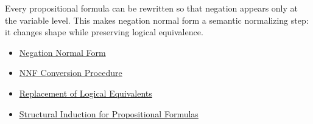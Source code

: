 \begin{remark*}[Interpretation]
Every propositional formula can be rewritten so that negation appears only at
the variable level. This makes negation normal form a semantic normalizing step:
it changes shape while preserving logical equivalence.
\end{remark*}

\begin{dependencies}
\begin{itemize}
  \item \hyperref[def:negation-normal-form-propositional-logic]{Negation Normal Form}
  \item \hyperref[def:nnf-conversion-procedure-propositional-logic]{NNF Conversion Procedure}
  \item \hyperref[thm:replacement-of-logical-equivalents-propositional-logic]{Replacement of Logical Equivalents}
  \item \hyperref[thm:structural-induction-propositional-formulas]{Structural Induction for Propositional Formulas}
\end{itemize}
\end{dependencies}
